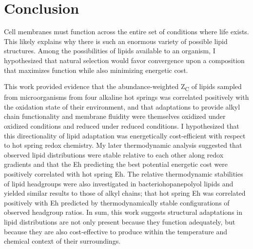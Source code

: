 \chapter[CONCLUSION]{Conclusion}

Cell membranes must function across the entire set of conditions where life exists. This likely explains why there is such an enormous variety of possible lipid structures. Among the possibilities of lipids available to an organism, I hypothesized that natural selection would favor convergence upon a composition that maximizes function while also minimizing energetic cost.


This work provided evidence that the abundance-weighted Z\textsubscript{C} of lipids sampled from microorganisms from four alkaline hot springs was correlated positively with the oxidation state of their environment, and that adaptations to provide alkyl chain functionality and membrane fluidity were themselves oxidized under oxidized conditions and reduced under reduced conditions. I hypothesized that this directionality of lipid adaptation was energetically cost-efficient with respect to hot spring redox chemistry. My later thermodynamic analysis suggested that observed lipid distributions were stable relative to each other along redox gradients and that the Eh predicting the best potential energetic cost were positively correlated with hot spring Eh. The relative thermodynamic stabilities of lipid headgroups were also investigated in bacteriohopanepolyol lipids and yielded similar results to those of alkyl chains; that hot spring Eh was correlated positively with Eh predicted by thermodynamically stable configurations of observed headgroup ratios. In sum, this work suggests structural adaptations in lipid distributions are not only present because they function adequately, but because they are also cost-effective to produce within the temperature and chemical context of their surroundings.


